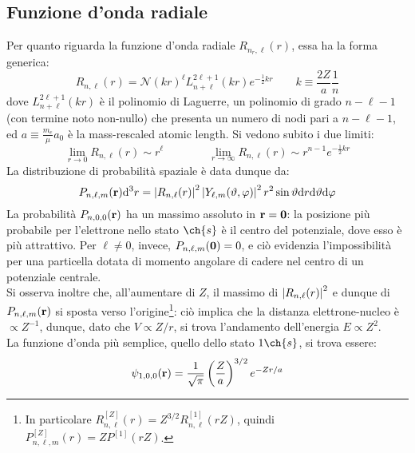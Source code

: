\subsection{Funzione d'onda radiale}

Per quanto riguarda la funzione d'onda radiale $ R_{n_r,\ell}(r) $, essa ha la forma generica:
\begin{equation}
	R_{n,\ell}(r) = \mathcal{N} (kr)^\ell L_{n+\ell}^{2\ell + 1}(kr) e^{-\frac{1}{2} kr}
	\qquad
	k \equiv \frac{2Z}{a} \frac{1}{n}
	\label{eq:1.5}
\end{equation}
dove $ L_{n+\ell}^{2\ell+1}(kr) $ è il polinomio di Laguerre, un polinomio di grado $ n - \ell - 1 $ (con termine noto non-nullo) che presenta un numero di nodi pari a $ n - \ell - 1 $, ed $ a \equiv \frac{m_e}{\mu} a_0 $ è la mass-rescaled atomic length. Si vedono subito i due limiti:
\begin{equation*}
	\lim_{r \rightarrow 0} R_{n,\ell}(r) \sim r^\ell
	\qquad \qquad
	\lim_{r \rightarrow \infty} R_{n,\ell}(r) \sim r^{n-1} e^{-\frac{1}{2} kr}
\end{equation*}
La distribuzione di probabilità spaziale è data dunque da:
\begin{equation}
	P_{n,\ell,m}(\mathbf{r}) \mathrm{d}^3r = \left\lvert R_{n,\ell}(r)\right\rvert^2 \left\lvert Y_{\ell,m}(\vartheta,\varphi)\right\rvert^2 r^2 \sin{\vartheta} \mathrm{d} r \mathrm{d} \vartheta \mathrm{d} \varphi
	\label{eq:1.6}
\end{equation}
La probabilità $ P_{n,0,0}(\mathbf{r}) $ ha un massimo assoluto in $ \mathbf{r} = \mathbf{0} $: la posizione più probabile per l'elettrone nello stato $ \ch{s} $ è il centro del potenziale, dove esso è più attrattivo. Per $ \ell \neq 0 $, invece, $ P_{n,\ell,m}(\mathbf{0}) = 0 $, e ciò evidenzia l'impossibilità per una particella dotata di momento angolare di cadere nel centro di un potenziale centrale.\\
Si osserva inoltre che, all'aumentare di $ Z $, il massimo di $ \left\lvert R_{n,\ell}(r)\right\rvert^2 $ e dunque di $ P_{n,\ell,m}(\mathbf{r}) $ si sposta verso l'origine\footnote{In particolare $ R_{n,\ell}^{[Z]}(r) = Z^{3/2} R_{n,\ell}^{[1]}(rZ) $, quindi $ P_{n,\ell,m}^{[Z]}(r) = Z P^{[1]}(rZ) $.}: ciò implica che la distanza elettrone-nucleo è $ \propto Z^{-1} $, dunque, dato che $ V \propto Z/r $, si trova l'andamento dell'energia $ E \propto Z^2 $.\\
La funzione d'onda più semplice, quello dello stato $ 1\ch{s} $, si trova essere:
\begin{equation}
	\psi_{1,0,0}(\mathbf{r}) = \frac{1}{\sqrt{\pi}} \left( \frac{Z}{a} \right)^{3/2} e^{- Z r / a}
	\label{eq:1.7}
\end{equation}

